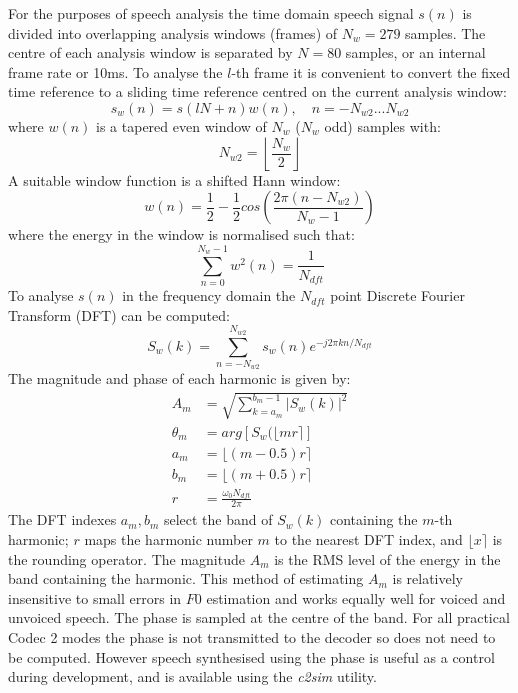 \documentclass{article}
\begin{document}
For the purposes of speech analysis the time domain speech signal $s(n)$ is divided into overlapping analysis windows (frames) of $N_w=279$ samples. The centre of each analysis window is separated by $N=80$ samples, or an internal frame rate or 10ms. To analyse the $l$-th frame it is convenient to convert the fixed time reference to a sliding time reference centred on the current analysis window:
\begin{equation}
s_w(n) = s(lN + n) w(n), \quad n = - N_{w2} ... N_{w2}
\end{equation}
where $w(n)$ is a tapered even window of $N_w$ ($N_w$ odd) samples with:
\begin{equation}
N_{w2} = \left \lfloor \frac{N_w}{2} \right \rfloor
\end{equation}
A suitable window function is a shifted Hann window:
\begin{equation}
w(n) = \frac{1}{2} - \frac{1}{2} cos \left(\frac{2 \pi (n- N_{w2})}{N_w-1} \right)
\end{equation}
where the energy in the window is normalised such that:
\begin{equation}
\sum_{n=0}^{N_w-1}w^2(n) = \frac{1}{N_{dft}}
\end{equation}
To analyse $s(n)$ in the frequency domain the $N_{dft}$ point Discrete Fourier Transform (DFT) can be computed:
\begin{equation}
S_w(k) = \sum_{n=-N_{w2}}^{N_{w2}} s_w(n) e^{-j 2 \pi k n / N_{dft}}
\end{equation}
The magnitude and phase of each harmonic is given by:
\begin{equation}
\label{eq:mag_est}
\begin{split}
A_m      &= \sqrt{\sum_{k=a_m}^{b_m-1} |S_w(k)|^2 } \\
\theta_m &= arg \left[ S_w(\lfloor m r \rceil \right] \\
a_m      &= \lfloor (m - 0.5)r \rceil \\
b_m      &= \lfloor (m + 0.5)r \rceil \\
r        &= \frac{\omega_0 N_{dft}}{2 \pi} 
\end{split}
\end{equation}
The DFT indexes $a_m, b_m$ select the band of $S_w(k)$ containing the $m$-th harmonic; $r$ maps the harmonic number $m$ to the nearest DFT index, and $\lfloor x \rceil$ is the rounding operator. The magnitude $A_m$ is the RMS level of the energy in the band containing the harmonic.  This method of estimating $A_m$ is relatively insensitive to small errors in $F0$ estimation and works equally well for voiced and unvoiced speech. The phase is sampled at the centre of the band.  For all practical Codec 2 modes the phase is not transmitted to the decoder so does not need to be computed.  However speech synthesised using the phase is useful as a control during development, and is available using the \emph{c2sim} utility.
\end{document}
